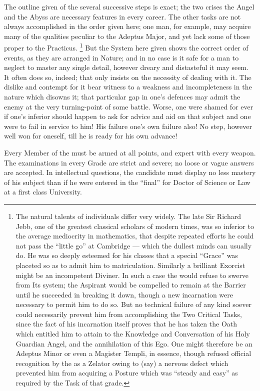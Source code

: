 The outline given of the several successive steps is exact; the two crises \textemdash{} the Angel and the Abyss \textemdash{} are necessary features in every career. The other tasks are not always accomplished in the order given here; one man, for example, may acquire many of the qualities peculiar to the Adeptus Major, and yet lack some of those proper to the Practicus. \footnote{The natural talents of individuals differ very widely. The late Sir Richard Jebb, one of the greatest classical scholars of modern times, was so inferior to the average mediocrity in mathematics, that despite repeated efforts he could not pass the \enquote{little go} at Cambridge — which the dullest minds can usually do. He was so deeply esteemed for his classes that a special \enquote{Grace} was placeted so as to admit him to matriculation. Similarly a brilliant Exorcist might be an incompetent Diviner. In such a case the \Argentium{} would refuse to swerve from Its system; the Aspirant would be compelled to remain at the Barrier until he succeeded in breaking it down, though a new incarnation were necessary to permit him to do so. But no technical failure of any kind soever could necessarily prevent him from accomplishing the Two Critical Tasks, since the fact of his incarnation itself proves that he has taken the Oath which entitled him to attain to the Knowledge and Conversation of his Holy Guardian Angel, and the annihilation of this Ego. One might therefore be an Adeptus Minor or even a Magister Templi, in essence, though refused official recognition by the \Argentium{} as a Zelator owing to (say) a nervous defect which prevented him from acquiring a Posture which was \enquote{steady and easy} as required by the Task of that grade.} But the System here given shows the correct order of events, as they are arranged in Nature; and in no case is it safe for a man to neglect to master any single detail, however dreary and distasteful it may seem. It often does so, indeed; that only insists on the necessity of dealing with it. The dislike and contempt for it bear witness to a weakness and incompleteness in the nature which disowns it; that particular gap in one's defences may admit the enemy at the very turning-point of some battle. Worse, one were shamed for ever if one's inferior should happen to ask for advice and aid on that subject and one were to fail in service to him! His failure \textemdash{} one's own failure also! No step, however well won for oneself, till he is ready for his own advance!

Every Member of the \Argentium{} must be armed at all points, and expert with every weapon. The examinations in every Grade are strict and severe; no loose or vague answers are accepted. In intellectual questions, the candidate must display no less mastery of his subject than if he were entered in the \enquote{final} for Doctor of Science or Law at a first class University.


